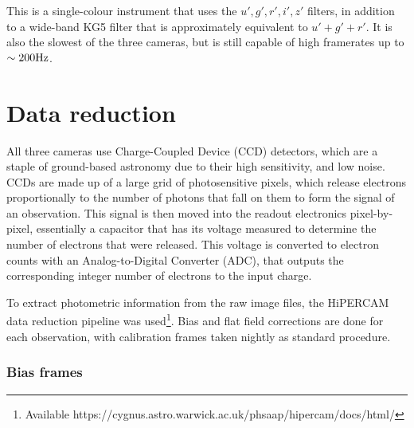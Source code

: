 This is a single-colour instrument that uses the $u',g',r',i',z'$ filters, in addition to a wide-band KG5 filter that is approximately equivalent to $u' + g' + r'$. It is also the slowest of the three cameras, but is still capable of high framerates up to $\sim 200 \rm Hz$.


\section{Data reduction}
\label{sect:data reduction}

All three cameras use Charge-Coupled Device (CCD) detectors, which are a staple of ground-based astronomy due to their high sensitivity, and low noise.
CCDs are made up of a large grid of photosensitive pixels, which release electrons proportionally to the number of photons that fall on them to form the signal of an observation. This signal is then moved into the readout electronics pixel-by-pixel, essentially a capacitor that has its voltage measured to determine the number of electrons that were released. This voltage is converted to electron counts with an Analog-to-Digital Converter (ADC), that outputs the corresponding integer number of electrons to the input charge.

To extract photometric information from the raw image files, the HiPERCAM data reduction pipeline was used\footnote{Available https://cygnus.astro.warwick.ac.uk/phsaap/hipercam/docs/html/}. 
Bias and flat field corrections are done for each observation, with calibration frames taken nightly as standard procedure.


\subsubsection{Bias frames}

